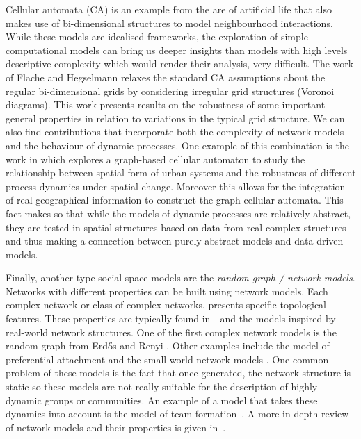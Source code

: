 \documentclass[preprint,number]{elsarticle}
\begin{document}
	Cellular automata (CA) is an example from the are of artificial life that also makes use of bi-dimensional structures to model neighbourhood interactions. While these models are idealised frameworks, the exploration of simple computational models can bring us deeper insights than models with high levels descriptive complexity which would render their analysis, very difficult. The work of Flache and Hegselmann \cite{FlacheHegselmann2001} relaxes the standard CA assumptions about the regular bi-dimensional grids by considering irregular grid structures (Voronoi diagrams). This work presents results on the robustness of some important general properties in relation to variations in the typical grid structure. We can also find contributions that incorporate both the complexity of network models and the behaviour of dynamic processes. One example of this combination is the work in \cite{Sullivan2000} which explores a graph-based cellular automaton to study the relationship between spatial form of urban systems and the robustness of different process dynamics under spatial change. Moreover this allows for the integration of real geographical information to construct the graph-cellular automata. This fact makes so that while the models of dynamic processes are relatively abstract, they are tested in spatial structures based on data from real complex structures and thus making a connection between purely abstract models and data-driven models.
	
	
	Finally, another type social space models are the \textit{random graph / network models}. Networks with different properties can be built using network models. Each complex network or class of complex networks, presents specific topological features. These properties are typically found in---and the models inspired by---real-world network structures. One of the first complex network models is the random graph from Erdős and Renyi \cite{Erdos1959}. Other examples include the model of preferential attachment \cite{Barabasi1999} and the small-world network models \cite{Watts1998}. One common problem of these models is the fact that once generated, the network structure is static so these models are not really suitable for the description of highly dynamic groups or communities. An example of a model that takes these dynamics into account is the model of team formation~\cite{Gaston2005}. A more in-depth review of network models and their properties is given in~\cite{Nunes2012}.
	
\end{document}
